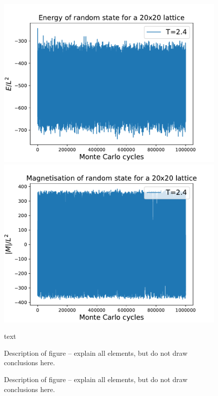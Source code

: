 \documentclass{emulateapj}
\begin{document}
\begin{figure}[H]
{{\includegraphics[scale=0.53]{EofMCC-T2_4-L20-1e6.pdf}}
}\qquad
{{\includegraphics[scale=0.53]{MofMCC-T2_4-L20-1e6.pdf}}
}\qquad
\caption{text}
\label{fig:GS}
\end{figure}

\begin{figure}[t]
\mbox{}
\caption{Description of figure -- explain all elements, but do not
draw conclusions here.}
\label{fig:figure_label}
\end{figure}

\begin{figure}[t]
\mbox{}
\caption{Description of figure -- explain all elements, but do not
draw conclusions here.}
\label{fig:figure_label}
\end{figure}
\end{document}
